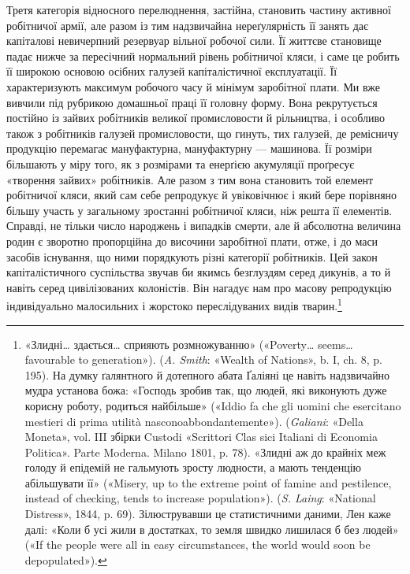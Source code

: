 Третя категорія відносного перелюднення, застійна, становить частину активної робітничої армії, але
разом із тим надзвичайна нереґулярність її занять дає капіталові невичерпний резервуар вільної
робочої сили. Її життєве становище падає нижче за
пересічний нормальний рівень робітничої кляси, і саме це робить її широкою основою осібних галузей
капіталістичної експлуатації. Її характеризують максимум робочого часу й мінімум заробітної плати.
Ми вже вивчили під рубрикою домашньої праці її головну форму. Вона рекрутується постійно із зайвих
робітників великої промисловости й рільництва, і особливо також з робітників галузей промисловости,
що гинуть, тих галузей, де ремісничу продукцію перемагає мануфактурна, мануфактурну — машинова. Її
розміри більшають у міру того, як з розмірами та енерґією акумуляції проґресує «творення зайвих»
робітників. Але разом з тим вона становить той елемент робітничої кляси, який сам себе репродукує й
увіковічнює і який бере порівняно більшу участь у загальному зростанні робітничої кляси, ніж решта
її елементів. Справді, не тільки число народжень і випадків смерти, але й абсолютна величина родин є
зворотно пропорційна до височини заробітної плати, отже, і до маси засобів існування, що ними
порядкують різні категорії робітників. Цей закон капіталістичного суспільства звучав би якимсь
безглуздям серед дикунів, а то й навіть серед цивілізованих колоністів. Він нагадує нам про масову
репродукцію індивідуально малосильних і жорстоко переслідуваних видів тварин.\footnote{
«Злидні\dots{} здається\dots{} сприяють розмножуванню» («Poverty\dots{} seems\dots{} favourable to generation»).
(\emph{A. Smith}: «Wealth of Nations», b. I, ch. 8, p. 195). На думку ґалянтного й дотепного абата Ґаліяні
це навіть надзвичайно мудра установа божа: «Господь зробив так, що людей, які виконують дуже корисну
роботу, родиться найбільше» («Iddio fa che
gli uomini che esercitano mestieri di prima utilità nasconoabbondantemente»). (\emph{Galiani}: «Della
Moneta», vol. III збірки Custodi «Scrittori Clas sici Italiani di Economia Politica». Parte Moderna.
Milano 1801, p. 78). «Злидні аж до крайніх меж голоду й епідемій не гальмують зросту людности, а
мають тенденцію абільшувати її» («Misery, up to the extreme point of famine and pestilence, instead
of checking, tends to increase population»).
(\emph{S. Laing}: «National Distress», 1844, p. 69). Зілюструвавши це статистичними даними, Лен каже далі:
«Коли б усі жили в достатках, то земля швидко лишилася б без людей» («If the people were all in easy
circumstances, the world would soon be depopulated»).
}

